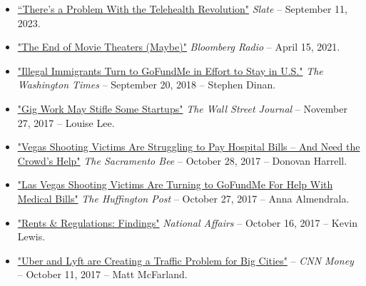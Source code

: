 \documentclass[10.5pt,letterpaper,sans]{moderncv}        %
\begin{document}
\begin{itemize}

\item \textcolor{gray}{\href{https://slate.com/technology/2023/09/telehealth-revolution-revenue-rural-hospitals-research.html}{``There's a Problem With the Telehealth Revolution"}} \textit{Slate} -- September 11, 2023.

\item \textcolor{gray}{\href{https://www.bloomberg.com/news/audio/2021-04-15/baystate-business-the-end-of-movie-theaters-maybe-radio}{"The End of Movie Theaters (Maybe)"}} \textit{Bloomberg Radio} -- April 15, 2021.

\item \textcolor{gray}{\href{https://www.washingtontimes.com/news/2018/sep/20/pro-trumpers-turn-gofundme-build-border-wall/}{"Illegal Immigrants Turn to GoFundMe in Effort to Stay in U.S."}} \textit{The Washington Times} -- September 20, 2018 -- Stephen Dinan.

\item \textcolor{gray}{\href{https://www.wsj.com/articles/gig-work-may-stifle-some-startups-1511751901}{"Gig Work May Stifle Some Startups"}}  \textit{The Wall Street Journal} 
-- November 27, 2017 -- Louise Lee.

\item \textcolor{gray}{\href{http://www.sacbee.com/news/nation-world/national/article181505276.html}{"Vegas Shooting Victims Are Struggling to Pay Hospital Bills -- And Need the Crowd's Help"}} \textit{The Sacramento Bee} -- October 28, 2017 -- Donovan Harrell.

\item \textcolor{gray}{\href{https://www.huffingtonpost.com/entry/vegas-shooting-victims-crowdfunding_us_59f3a51be4b07fdc5fbe465c}{"Las Vegas Shooting Victims Are Turning to GoFundMe For Help With Medical Bills"}} \textit{The Huffington Post} -- October 27, 2017 -- Anna Almendrala.

\item \textcolor{gray}{\href{https://nationalaffairs.com/blog/detail/findings-a-daily-roundup/rents-and-regulations}{"Rents \& Regulations: Findings"}} \textit{National Affairs} -- October 16, 2017 -- Kevin Lewis.

\item \textcolor{gray}{\href{https://money.cnn.com/2017/10/11/technology/future/ride-hailing-cities-public-transit/index.html?section=money_topstories}{"Uber and Lyft are Creating a Traffic Problem for Big Cities"}} -- \textit{CNN Money} -- October 11, 2017 -- Matt McFarland.


\end{itemize}
\end{document}
